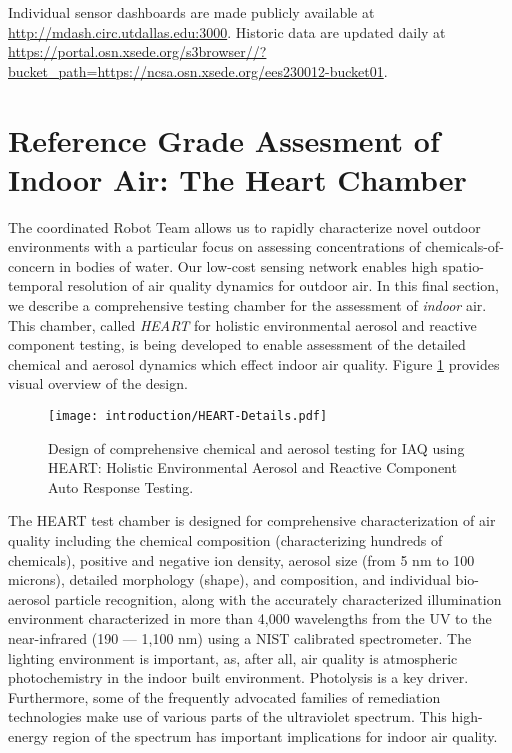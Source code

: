 Individual sensor dashboards are made publicly available at \url{http://mdash.circ.utdallas.edu:3000}. Historic data are updated daily at \url{https://portal.osn.xsede.org/s3browser//?bucket_path=https://ncsa.osn.xsede.org/ees230012-bucket01}.


\section{Reference Grade Assesment of Indoor Air: The Heart Chamber}

The coordinated Robot Team allows us to rapidly characterize novel outdoor environments with a particular focus on assessing concentrations of chemicals-of-concern in bodies of water. Our low-cost sensing network enables high spatio-temporal resolution of air quality dynamics for outdoor air. In this final section, we describe a comprehensive testing chamber for the assessment of \textit{indoor} air. This chamber, called \textit{HEART} for holistic environmental aerosol and reactive component testing, is being developed to enable assessment of the detailed chemical and aerosol dynamics which effect indoor air quality. Figure \ref{Figure.HEART-Details} provides visual overview of the design.

\begin{figure}[!hbt]
  \centering
  \texttt{[image: introduction/HEART-Details.pdf]}
	\caption{Design of comprehensive chemical and aerosol testing for IAQ using HEART: Holistic Environmental Aerosol and Reactive Component Auto Response Testing.}
	\label{Figure.HEART-Details}
\end{figure}

The HEART test chamber is designed for comprehensive characterization of air quality including the chemical composition (characterizing hundreds of chemicals), positive and negative ion density, aerosol size (from 5 nm to 100 microns), detailed morphology (shape), and composition, and individual bio-aerosol particle recognition, along with the accurately characterized illumination environment characterized in more than 4,000 wavelengths from the UV to the near-infrared (190 — 1,100 nm) using a NIST calibrated spectrometer. The lighting environment is important, as, after all, air quality is atmospheric photochemistry in the indoor built environment. Photolysis is a key driver. Furthermore, some of the frequently advocated families of remediation technologies make use of various parts of the ultraviolet spectrum. This high-energy region of the spectrum has important implications for indoor air quality.

